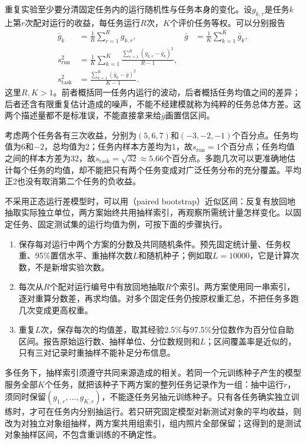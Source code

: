 重复实验至少要分清固定任务内的运行随机性与任务本身的变化。设$g_{k,r}$是任务$k$上第$r$次配对运行的收益，每任务运行$R$次，$K$个评价任务等权。可以分别报告
\begin{equation}
  \begin{aligned}
    \bar g_k&=\frac1R\sum_{r=1}^{R}g_{k,r},&
    \bar g&=\frac1K\sum_{k=1}^{K}\bar g_k,\\
    s_{\mathrm{run}}^2
      &=\frac1K\sum_{k=1}^{K}
        \frac{\sum_{r=1}^{R}(g_{k,r}-\bar g_k)^2}{R-1},\\
    s_{\mathrm{task}}^2
      &=\frac{\sum_{k=1}^{K}(\bar g_k-\bar g)^2}{K-1}.
  \end{aligned}
  \label{eq:ket-evaluation-two-variations}
\end{equation}
这里$R,K>1$。前者概括同一任务内运行的波动，后者概括任务均值之间的差异；后者还含有限重复估计造成的噪声，不能不经建模就称为纯粹的任务总体方差。这两个描述量都不是标准误，不能直接拿来给$\bar g$画置信区间。

考虑两个任务各有三次收益，分别为$(5,6,7)$和$(-3,-2,-1)$个百分点。任务均值为6和$-2$，总均值为2；任务内样本方差均为1，故$s_{\mathrm{run}}=1$个百分点；任务均值之间的样本方差为32，故$s_{\mathrm{task}}=\sqrt{32}\approx5.66$个百分点。多跑几次可以更准确地估计每个任务的均值，却不能把只有两个任务变成对广泛任务分布的充分覆盖。平均正2也没有取消第二个任务的负收益。

不采用正态运行差模型时，可以用（paired bootstrap）近似区间：反复有放回地抽取实际独立单位，两方案始终共用抽样索引，再观察所需统计量怎样变化。以固定任务、固定测试集的运行均值为例，可按下面的步骤执行。
\begin{enumerate}
  \item 保存每对运行中两个方案的分数及共同随机条件。预先固定统计量、任务权重、95\%置信水平、重抽样次数$L$和随机种子；例如取$L=10000$，它是计算次数，不是新增实验次数。
  \item 每次从$R$个配对运行编号中有放回地抽取$R$个索引。两方案使用同一串索引，逐对重算分数差，再求均值。对多个固定任务仍按原权重汇总，不把任务多跑几次变成更高权重。
  \item 重复$L$次，保存每次的均值差，取其经验2.5\%与97.5\%分位数作为百分位自助区间。报告原始运行数、抽样单位、分位数规则和$L$；区间覆盖率是近似的，只有三对记录时重抽样不能补足分布信息。
\end{enumerate}

多任务下，抽样索引须遵守共同来源造成的相关。若同一个元训练种子产生的模型服务全部$K$个任务，就把该种子下两方案的整列任务记录作为一组：抽中运行$r$，须同时保留$(g_{1,r},\ldots,g_{K,r})$，不能逐任务另抽元训练种子。只有各任务确实独立训练时，才可在任务内分别抽运行。若只研究固定模型对新测试对象的平均收益，则改为对独立对象组抽样，两方案共用组索引，组内照片全部保留；这得到的是测试对象抽样区间，不包含重训练的不确定性。

